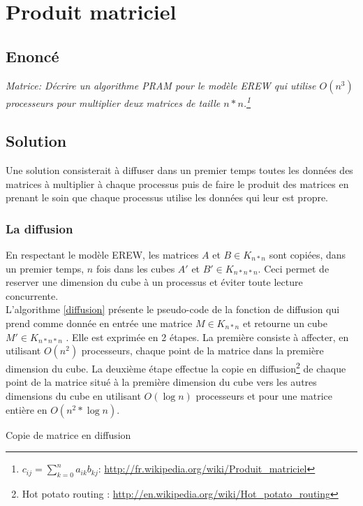 \section{Produit matriciel}

\subsection{Enoncé}
\textit{Matrice: Décrire un algorithme PRAM pour le modèle EREW qui utilise $O(n^3)$ processeurs pour multiplier deux matrices de taille $n*n$.\footnote{$c_{ij} = \sum_{k=0}^n a_{ik} b_{kj}$: \url{http://fr.wikipedia.org/wiki/Produit_matriciel}}}

\subsection{Solution}
Une solution consisterait à diffuser dans un premier temps toutes les données des matrices à multiplier à chaque processus puis de faire le produit des matrices en prenant le soin que chaque processus utilise les données qui leur est propre.

\subsubsection{La diffusion}
En respectant le modèle EREW, les matrices $A$ et $B \in K_{n*n}$ sont copiées, dans un premier temps, $n$ fois dans les cubes $A'$ et $B' \in K_{n*n*n}$. Ceci permet de reserver une dimension du cube à un processus et éviter toute lecture concurrente.\\

L'algorithme \ref{diffusion} présente le pseudo-code de la fonction de diffusion qui prend comme donnée en entrée une matrice $M \in K_{n*n}$ et retourne un cube $M' \in K_{n*n*n}$ . Elle est exprimée en 2 étapes. La première consiste à affecter, en utilisant $O(n^2)$ processeurs, chaque point de la matrice dans la première dimension du cube. La deuxième étape effectue la copie en diffusion\footnote{Hot potato routing : \url{http://en.wikipedia.org/wiki/Hot_potato_routing}} de chaque point de la matrice situé à la première dimension du cube vers les autres dimensions du cube en utilisant $O(\log{n})$ processeurs et pour une matrice entière en $O(n^2 * \log{n})$.

\incmargin{1em}
\begin{algorithm}[here]
  \dontprintsemicolon
  \label{diffusion}
  \caption{Copie de matrice en diffusion}
\end{algorithm}
\decmargin{1em}

